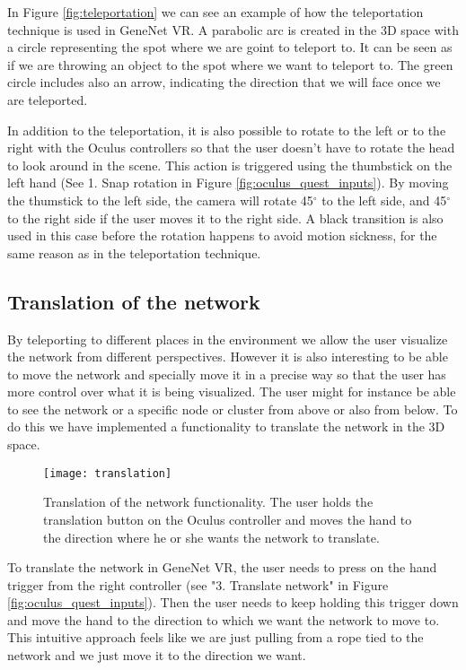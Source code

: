 In Figure \ref{fig:teleportation} we can see an example of how the teleportation technique is used in GeneNet VR. A  parabolic arc is created in the 3D space with a circle representing the spot where we are goint to teleport to. It can be seen as if we are throwing an object to the spot where we want to teleport to. The green circle includes also an arrow, indicating the direction that we will face once we are teleported.

In addition to the teleportation, it is also possible to rotate to the left or to the right with the Oculus controllers so that the user doesn't have to rotate the head to look around in the scene. This action is triggered using the thumbstick on the left hand (See 1. Snap rotation in Figure \ref{fig:oculus_quest_inputs}). By moving the thumstick to the left side, the camera will rotate 45$^{\circ}$ to the left side, and 45$^{\circ}$ to the right side if the user moves it to the right side. A black transition is also used in this case before the rotation happens to avoid motion sickness, for the same reason as in the teleportation technique.

\subsection{Translation of the network}
By teleporting to different places in the environment we allow the user visualize the network from different perspectives. However it is also interesting to be able to move the network and specially move it in a precise way so that the user has more control over what it is being visualized. The user might for instance be able to see the network or a specific node or cluster from above or also from below. To do this we have implemented a functionality to translate the network in the 3D space.

\begin{figure}[h!]
    \centering%
    \texttt{[image: translation]}
    \caption{Translation of the network functionality. The user holds the translation button on the Oculus controller and moves the hand to the direction where he or she wants the network to translate.}
    \label{fig:translation}
\end{figure}%

To translate the network in GeneNet VR, the user needs to press on the hand trigger from the right controller (see "3. Translate network" in Figure \ref{fig:oculus_quest_inputs}). Then the user needs to keep holding this trigger down and move the hand to the direction to which we want the network to move to. This intuitive approach feels like we are just pulling from a rope tied to the network and we just move it to the direction we want.


